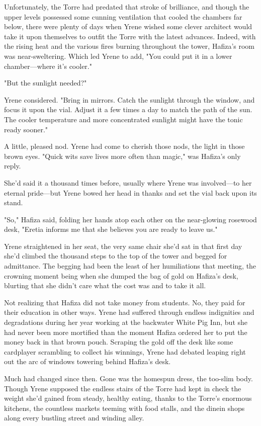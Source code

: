 Unfortunately, the Torre had predated that stroke of brilliance, and though the upper levels possessed some cunning ventilation that cooled the chambers far below, there were plenty of days when Yrene wished some clever architect would take it upon themselves to outfit the Torre with the latest advances.
Indeed, with the rising heat and the various fires burning throughout the tower, Hafiza's room was near-sweltering.
Which led Yrene to add, "You could put it in a lower chamber---where it's cooler."

"But the sunlight needed?"

Yrene considered.
"Bring in mirrors.
Catch the sunlight through the window, and focus it upon the vial.
Adjust it a few times a day to match the path of the sun.
The cooler temperature and more concentrated sunlight might have the tonic ready sooner."

A little, pleased nod.
Yrene had come to cherish those nods, the light in those brown eyes.
"Quick wits save lives more often than magic," was Hafiza's only reply.

She'd said it a thousand times before, usually where Yrene was involved---to her eternal pride---but Yrene bowed her head in thanks and set the vial back upon its stand.

"So," Hafiza said, folding her hands atop each other on the near-glowing rosewood desk, "Eretia informs me that she believes you are ready to leave us."

Yrene straightened in her seat, the very same chair she'd sat in that first day she'd climbed the thousand steps to the top of the tower and begged for admittance.
The begging had been the least of her humiliations that meeting, the crowning moment being when she dumped the bag of gold on Hafiza's desk, blurting that she didn't care what the cost was and to take it all.

Not realizing that Hafiza did not take money from students.
No, they paid for their education in other ways.
Yrene had suffered through endless indignities and degradations during her year working at the backwater White Pig Inn, but she had never been more mortified than the moment Hafiza ordered her to put the money back in that brown pouch.
Scraping the gold off the desk like some cardplayer scrambling to collect his winnings, Yrene had debated leaping right out the arc of windows towering behind Hafiza's desk.

Much had changed since then.
Gone was the homespun dress, the too-slim body.
Though Yrene supposed the endless stairs of the Torre had kept in check the weight she'd gained from steady, healthy eating, thanks to the Torre's enormous kitchens, the countless markets teeming with food stalls, and the dinein shops along every bustling street and winding alley.

